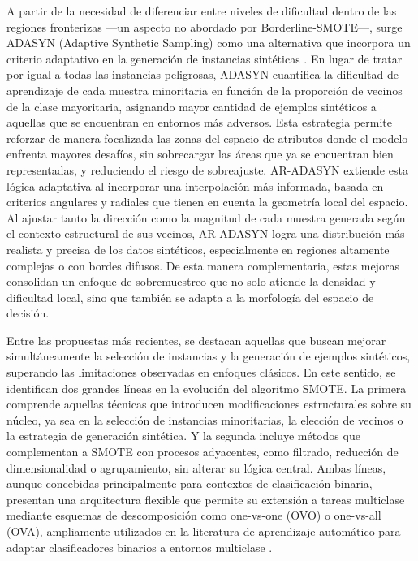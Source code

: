 \documentclass[12pt,a4paper]{article}
\begin{document}
A partir de la necesidad de diferenciar entre niveles de dificultad dentro de las regiones fronterizas —un aspecto no abordado por Borderline-SMOTE—, surge ADASYN (Adaptive Synthetic Sampling) como una alternativa que incorpora un criterio adaptativo en la generación de instancias sintéticas \parencite{he2008adasyn}. En lugar de tratar por igual a todas las instancias peligrosas, ADASYN cuantifica la dificultad de aprendizaje de cada muestra minoritaria en función de la proporción de vecinos de la clase mayoritaria, asignando mayor cantidad de ejemplos sintéticos a aquellas que se encuentran en entornos más adversos. Esta estrategia permite reforzar de manera focalizada las zonas del espacio de atributos donde el modelo enfrenta mayores desafíos, sin sobrecargar las áreas que ya se encuentran bien representadas, y reduciendo el riesgo de sobreajuste. AR-ADASYN \parencite{park2024radius} extiende esta lógica adaptativa al incorporar una interpolación más informada, basada en criterios angulares y radiales que tienen en cuenta la geometría local del espacio. Al ajustar tanto la dirección como la magnitud de cada muestra generada según el contexto estructural de sus vecinos, AR-ADASYN logra una distribución más realista y precisa de los datos sintéticos, especialmente en regiones altamente complejas o con bordes difusos. De esta manera complementaria, estas mejoras consolidan un enfoque de sobremuestreo que no solo atiende la densidad y dificultad local, sino que también se adapta a la morfología del espacio de decisión.

Entre las propuestas más recientes, se destacan aquellas que buscan mejorar simultáneamente la selección de instancias y la generación de ejemplos sintéticos, superando las limitaciones observadas en enfoques clásicos. En este sentido, se identifican dos grandes líneas en la evolución del algoritmo SMOTE. La primera comprende aquellas técnicas que introducen modificaciones estructurales sobre su núcleo, ya sea en la selección de instancias minoritarias, la elección de vecinos o la estrategia de generación sintética. Y la segunda incluye métodos que complementan a SMOTE con procesos adyacentes, como filtrado, reducción de dimensionalidad o agrupamiento, sin alterar su lógica central. Ambas líneas, aunque concebidas principalmente para contextos de clasificación binaria, presentan una arquitectura flexible que permite su extensión a tareas multiclase mediante esquemas de descomposición como one-vs-one (OVO) o one-vs-all (OVA), ampliamente utilizados en la literatura de aprendizaje automático para adaptar clasificadores binarios a entornos multiclase \parencite{fernandez2018learning, nasaruddin2025smote}.
\end{document}
